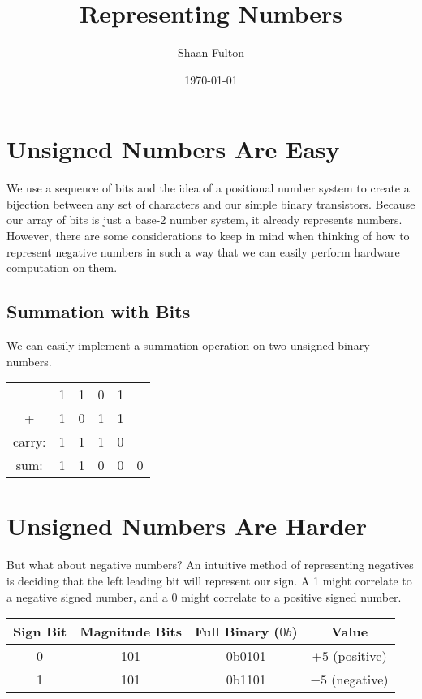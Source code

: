 \documentclass[12pt]{article}
\title{Representing Numbers}
\author{Shaan Fulton}
\date{\today}
\begin{document}
\maketitle

\section*{Unsigned Numbers Are Easy}

We use a sequence of bits and the idea of a positional number system to create a bijection between any set of characters and our simple binary transistors. Because our array of bits is just a base-2 number system, it already represents numbers. However, there are some considerations to keep in mind when thinking of how to represent negative numbers in such a way that we can easily perform hardware computation on them.


\subsection*{Summation with Bits}

We can easily implement a summation operation on two unsigned binary numbers.

\begin{center}
\begin{tabular}{cccccc}
    & 1 & 1 & 0 & 1 \\[-1pt]
  + & 1 & 0 & 1 & 1 \\ \hline
carry: & 1 & 1 & 1 & 0 & \\[-1pt]
sum: & 1 & 1 & 0 & 0 & 0 \\
\end{tabular}
\end{center}

\section*{Unsigned Numbers Are Harder}

But what about negative numbers? An intuitive method of representing negatives is deciding that the left leading bit will represent our sign. A 1 might correlate to a negative signed number, and a 0 might correlate to a positive signed number.

\begin{center}
\begin{tabular}{|c|c|c|c|}
    \hline
    \textbf{Sign Bit} & \textbf{Magnitude Bits} & \textbf{Full Binary ($0b$)} & \textbf{Value} \\
    \hline
    0 & 101 & 0b0101 & $+5$ (positive) \\
    1 & 101 & 0b1101 & $-5$ (negative) \\
    \hline
\end{tabular}
\end{center}
\end{document}
